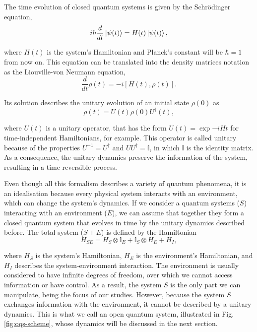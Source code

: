 The time evolution of closed quantum systems is given by the Schrödinger equation,
\begin{equation}
    i \hbar \frac{d}{dt} \ket{\psi (t)} = {H}(t) \ket{\psi (t)},
    \label{eq:schrodinger}
\end{equation}

\noindent where ${H}(t)$ is the system's Hamiltonian and Planck's constant will be $\hbar = 1$ from now on. This equation can be translated into the density matrices notation as the Liouville-von Neumann equation,
\begin{equation}
    \frac{d}{dt} {\rho}(t) = - i [{H}(t), {\rho} (t)].
    \label{eq:liouville-von-neumann}
\end{equation}

\noindent Its solution describes the unitary evolution of an initial state ${\rho}(0)$ as
\begin{equation}
    {\rho}(t) = {U}(t) {\rho} (0) {U}^\dagger (t),
    \label{eq:unitary-evol-rho}
\end{equation}

\noindent where ${U}(t)$ is a unitary operator, that has the form ${U}(t) = \exp{-iH t}$ for time-independent Hamiltonians, for example. This operator is called unitary because of the properties ${U}^{-1} = {U}^\dagger$ and ${U} {U}^\dagger = \mathbb{I}$, in which $\mathbb{I}$ is the identity matrix. As a consequence, the unitary dynamics preserve the information of the system, resulting in a time-reversible process.

Even though all this formalism describes a variety of quantum phenomena, it is an idealisation because every physical system interacts with an environment, which can change the system's dynamics. If we consider a quantum systems ($S$) interacting with an environment ($E$), we can assume that together they form a closed quantum system that evolves in time by the unitary dynamics described before. The total system ($S+E$) is defined by the Hamiltonian
\begin{equation}
    {H}_{SE} = {H}_S \otimes \mathbb{I}_E + \mathbb{I}_S \otimes {H}_E + {H}_I,
\end{equation}

\noindent where ${H}_S$ is the system's Hamiltonian, ${H}_E$ is the environment's Hamiltonian, and ${H}_I$ describes the system-environment interaction. The environment is usually considered to have infinite degrees of freedom, over which we cannot access information or have control. As a result, the system $S$ is the only part we can manipulate, being the focus of our studies. However, because the system $S$ exchanges information with the environment, it cannot be described by a unitary dynamics. This is what we call an open quantum system, illustrated in Fig. \ref{fig:oqs-scheme}, whose dynamics will be discussed in the next section.

